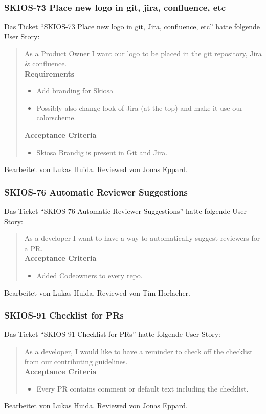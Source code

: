\subsubsection{SKIOS-73 Place new logo in git, jira, confluence, etc}
Das Ticket \enquote{SKIOS-73 Place new logo in git, Jira, confluence, etc} hatte folgende User Story:
\begin{quotation}
    As a Product Owner I want our logo to be placed in the git repository, Jira \& confluence. \\
    \textbf{Requirements}
    \begin{itemize}
        \item Add branding for Skiosa
        \item Possibly also change look of Jira (at the top) and make it use our colorscheme.  
    \end{itemize}   
    
    \textbf{Acceptance Criteria}
    \begin{itemize}
        \item Skiosa Brandig is present in Git and Jira.
    \end{itemize}
\end{quotation}
Bearbeitet von Lukas Huida.
Reviewed von Jonas Eppard.

\subsubsection{SKIOS-76 Automatic Reviewer Suggestions}
Das Ticket \enquote{SKIOS-76 Automatic Reviewer Suggestions} hatte folgende User Story:
\begin{quotation}
    As a developer I want to have a way to automatically suggest reviewers for a PR. \\
    \textbf{Acceptance Criteria}
    \begin{itemize}
        \item Added Codeowners to every repo.
    \end{itemize}
\end{quotation}
Bearbeitet von Lukas Huida.
Reviewed von Tim Horlacher.

\subsubsection{SKIOS-91 Checklist for PRs}
Das Ticket \enquote{SKIOS-91 Checklist for PRs} hatte folgende User Story:
\begin{quotation}
    As a developer, I would like to have a reminder to check off the checklist from our contributing guidelines. \\
    \textbf{Acceptance Criteria}
    \begin{itemize}
        \item Every PR contains comment or default text including the checklist.
    \end{itemize}
\end{quotation}
Bearbeitet von Lukas Huida.
Reviewed von Jonas Eppard.

